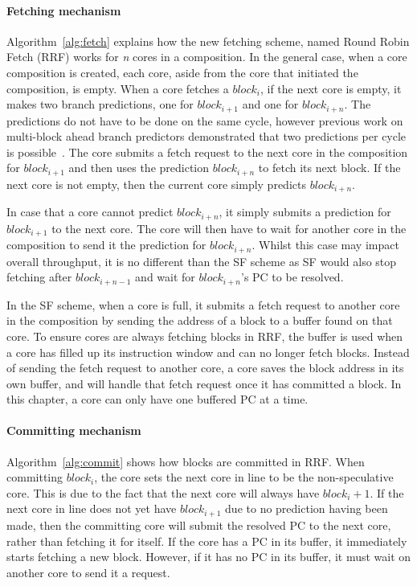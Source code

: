 \paragraph*{Fetching mechanism}
Algorithm~\ref{alg:fetch} explains how the new fetching scheme, named Round Robin Fetch (RRF) works for \textit{n} cores in a composition.
In the general case, when a core composition is created, each core, aside from the core that initiated the composition, is empty.
When a core fetches a $block_i$, if the next core is empty, it makes two branch predictions, one for $block_{i+1}$ and one for $block_{i+n}$.
The predictions do not have to be done on the same cycle, however previous work on multi-block ahead branch predictors demonstrated that two predictions per cycle is possible~\cite{SeznecMultipleBlock}.
The core submits a fetch request to the next core in the composition for $block_{i+1}$ and then uses the prediction $block_{i+n}$ to fetch its next block.
If the next core is not empty, then the current core simply predicts $block_{i+n}$.

In case that a core cannot predict $block_{i+n}$, it simply submits a prediction for $block_{i+1}$ to the next core.
The core will then have to wait for another core in the composition to send it the prediction for $block_{i+n}$.
Whilst this case may impact overall throughput, it is no different than the SF scheme as SF would also stop fetching after $block_{i+n-1}$ and wait for $block_{i+n}$'s PC to be resolved.

In the SF scheme, when a core is full, it submits a fetch request to another core in the composition by sending the address of a block to a buffer found on that core.
To ensure cores are always fetching blocks in RRF, the buffer is used when a core has filled up its instruction window and can no longer fetch blocks.
Instead of sending the fetch request to another core, a core saves the block address in its own buffer, and will handle that fetch request once it has committed a block.
In this chapter, a core can only have one buffered PC at a time.

\paragraph*{Committing mechanism}
Algorithm~\ref{alg:commit} shows how blocks are committed in RRF.
When committing $block_i$, the core sets the next core in line to be the non-speculative core.
This is due to the fact that the next core will always have $block_i+1$.
If the next core in line does not yet have $block_{i+1}$ due to no prediction having been made, then the committing core will submit the resolved PC to the next core, rather than fetching it for itself.
If the core has a PC in its buffer, it immediately starts fetching a new block.
However, if it has no PC in its buffer, it must wait on another core to send it a request.

